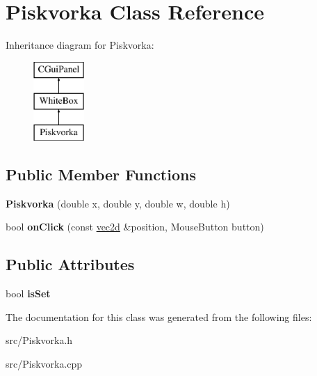 \hypertarget{class_piskvorka}{
\section{Piskvorka Class Reference}
\label{class_piskvorka}
}
Inheritance diagram for Piskvorka:\begin{figure}[H]
\begin{center}
\leavevmode
\includegraphics[height=3.000000cm]{class_piskvorka}
\end{center}
\end{figure}
\subsection*{Public Member Functions}
\begin{DoxyCompactItemize}
\item 
\hypertarget{class_piskvorka_a8d94b3b903f21a86bf029bd18b48e931}{
{\bfseries Piskvorka} (double x, double y, double w, double h)}
\label{class_piskvorka_a8d94b3b903f21a86bf029bd18b48e931}

\item 
\hypertarget{class_piskvorka_af19ec1df30afb349668b2834034f0fe9}{
bool {\bfseries onClick} (const \hyperlink{classvec2d}{vec2d} \&position, MouseButton button)}
\label{class_piskvorka_af19ec1df30afb349668b2834034f0fe9}

\end{DoxyCompactItemize}
\subsection*{Public Attributes}
\begin{DoxyCompactItemize}
\item 
\hypertarget{class_piskvorka_a9f41bd03cf8e1f1be6f86375506a56d0}{
bool {\bfseries isSet}}
\label{class_piskvorka_a9f41bd03cf8e1f1be6f86375506a56d0}

\end{DoxyCompactItemize}


The documentation for this class was generated from the following files:\begin{DoxyCompactItemize}
\item 
src/Piskvorka.h\item 
src/Piskvorka.cpp\end{DoxyCompactItemize}
